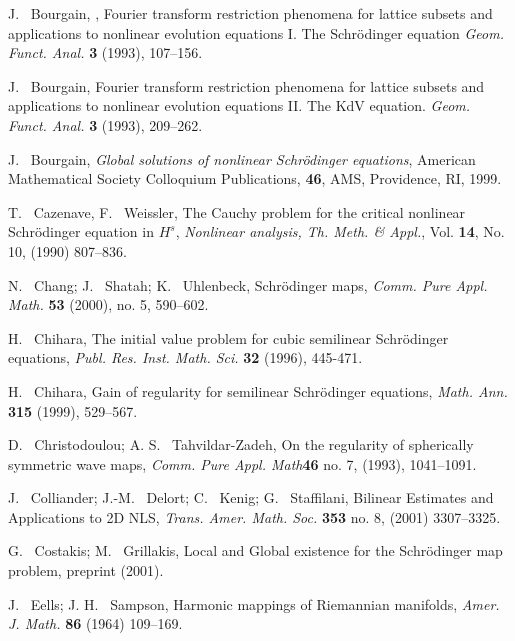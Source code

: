 \documentclass[draft,11pt,leqno]{amsart}
\begin{document}
\begin{thebibliography}{100}

%
%

 J. ~Bourgain, , Fourier transform restriction phenomena for lattice subsets and applications to nonlinear evolution equations I. The Schr\"odinger equation {\em Geom. Funct. Anal.} {\bf 3} (1993), 107--156.

 J. ~Bourgain, Fourier transform restriction phenomena for lattice subsets and applications to nonlinear evolution equations II. The KdV equation. {\em Geom. Funct. Anal.} {\bf 3} (1993), 209--262.

 J. ~Bourgain, {\em Global solutions of nonlinear Schr\"odinger equations},
American Mathematical Society Colloquium
Publications, {\bf 46}, AMS, 
Providence, RI, 1999. 

 T. ~Cazenave, F. ~Weissler, The Cauchy problem for the 
critical nonlinear Schr\"odinger equation in $H^s$, 
{\em Nonlinear analysis, Th. Meth. \& Appl.}, Vol. {\bf 14}, No. 10,  (1990)  807--836.


 N. ~Chang; J. ~Shatah; K. ~Uhlenbeck, Schr\"odinger maps,
{\em Comm. Pure Appl. Math.} {\bf 53} (2000), no. 5, 590--602.

 H. ~Chihara, The initial value problem for cubic semilinear Schr\"odinger equations, {\em Publ. Res. Inst. Math. Sci.} {\bf 32} (1996), 445-471. 
 
  H. ~Chihara, Gain of regularity for semilinear Schr\"odinger equations, {\em Math. Ann.} {\bf 315} (1999), 529--567. 

 D. ~Christodoulou; A. S. ~Tahvildar-Zadeh, On the
  regularity of spherically symmetric wave maps, {\em Comm. Pure
    Appl. Math}{\bf 46} no. 7, (1993), 1041--1091.   

 J. ~Colliander; J.-M. ~Delort; C. ~Kenig; 
G. ~Staffilani, Bilinear Estimates and Applications to 2D NLS, {\em  
Trans. Amer. Math. Soc.} {\bf 353} no. 8, (2001) 3307--3325.   


 G. ~Costakis; M. ~Grillakis, Local and Global
  existence for the Schr\"odinger map problem, preprint (2001). 

 J. ~Eells; J. H. ~Sampson, Harmonic mappings of Riemannian manifolds, {\em Amer. J. Math. } {\bf 86} (1964) 109--169.
 

\end{thebibliography}
\end{document}
